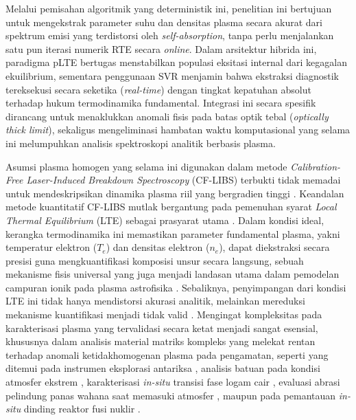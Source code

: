 \documentclass[10pt,leqno]{amsart}
\begin{document}
Melalui pemisahan algoritmik yang deterministik ini, penelitian ini bertujuan untuk mengekstrak parameter suhu dan densitas plasma secara akurat dari spektrum emisi yang terdistorsi oleh \textit{self-absorption}, tanpa perlu menjalankan satu pun iterasi numerik RTE secara \textit{online}. Dalam arsitektur hibrida ini, paradigma pLTE bertugas menstabilkan populasi eksitasi internal dari kegagalan ekuilibrium, sementara penggunaan SVR menjamin bahwa ekstraksi diagnostik tereksekusi secara seketika (\textit{real-time}) dengan tingkat kepatuhan absolut terhadap hukum termodinamika fundamental. Integrasi ini secara spesifik dirancang untuk menaklukkan anomali fisis pada batas optik tebal (\textit{optically thick limit}), sekaligus mengeliminasi hambatan waktu komputasional yang selama ini melumpuhkan analisis spektroskopi analitik berbasis plasma.

Asumsi plasma homogen yang selama ini digunakan dalam metode \textit{Calibration-Free Laser-Induced Breakdown Spectroscopy} (CF-LIBS) terbukti tidak memadai untuk mendeskripsikan dinamika plasma riil yang bergradien tinggi \cite{zaitsev_two-zone_2024}. Keandalan metode kuantitatif CF-LIBS mutlak bergantung pada pemenuhan syarat \textit{Local Thermal Equilibrium} (LTE) sebagai prasyarat utama \cite{cristoforetti_local_2010,favre_merlin_2025}. Dalam kondisi ideal, kerangka termodinamika ini memastikan parameter fundamental plasma, yakni temperatur elektron ($T_e$) dan densitas elektron ($n_e$), dapat diekstraksi secara presisi guna mengkuantifikasi komposisi unsur secara langsung, sebuah mekanisme fisis universal yang juga menjadi landasan utama dalam pemodelan campuran ionik pada plasma astrofisika \cite{fritzsche_atomic_2025}. Sebaliknya, penyimpangan dari kondisi LTE ini tidak hanya mendistorsi akurasi analitik, melainkan mereduksi mekanisme kuantifikasi menjadi tidak valid \cite{cristoforetti_local_2010,hansen_modeling_2021}. Mengingat kompleksitas pada karakterisasi plasma yang tervalidasi secara ketat menjadi sangat esensial, khususnya dalam analisis material matriks kompleks yang melekat rentan terhadap anomali ketidakhomogenan plasma pada pengamatan, seperti yang ditemui pada instrumen eksplorasi antariksa \cite{sawyers_database_2025,manelski_libs_2024}, analisis batuan pada kondisi atmosfer ekstrem \cite{zhang_improving_2025}, karakterisasi \textit{in-situ} transisi fase logam cair \cite{leosson_analysis_2022}, evaluasi abrasi pelindung panas wahana saat memasuki atmosfer \cite{leistikow_quantification_2026}, maupun pada pemantauan \textit{in-situ} dinding reaktor fusi nuklir \cite{marin_roldan_libs_2021}.
\end{document}
